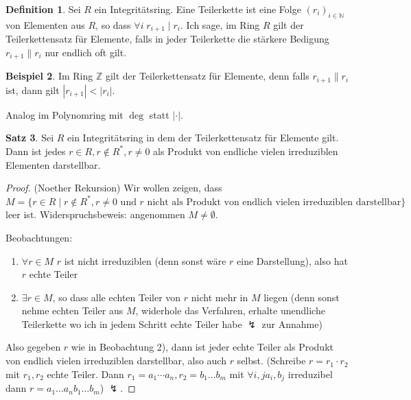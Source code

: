 \documentclass[12pt,parskip=full]{scrartcl}
\newcommand{\setN}{\mathbb{N}}
\newcommand{\setZ}{\mathbb{Z}}
\newcommand{\abs}[1]{{\left| #1 \right|}}
\theoremstyle{definition}
\newtheorem{theorem}{Satz}[section]
\newtheorem{definition}[theorem]{Definition}
\newtheorem{example}[theorem]{Beispiel}
\theoremstyle{remark}
\begin{document}
 	\begin{definition}
 		Sei $R$ ein Integritätsring. Eine Teilerkette ist eine Folge $(r_i)_{i \in \setN}$ von Elementen aus $R$, so dass $\forall i \; r_{i+1} \mid r_i$. Ich sage, im Ring $R$ gilt der Teilerkettensatz für Elemente, falls in jeder Teilerkette die stärkere Bedigung $r_{i+1} \parallel r_i$ nur endlich oft gilt.
 	\end{definition}
 
 	\begin{example}
 		Im Ring $\setZ$ gilt der Teilerkettensatz für Elemente, denn falls $r_{i+1} \parallel r_i$ ist, dann gilt $\abs{r_{i+1}} < \abs{r_i}$.
 		
 		Analog im Polynomring mit $\deg$ statt $\abs{\cdot}$.
 	\end{example}
 
 	\begin{theorem}
 		Sei $R$ ein Integritätsring in dem der Teilerkettensatz für Elemente gilt. Dann ist jedes $r \in R, r \notin R^*, r \neq 0$ als Produkt von endliche vielen irreduziblen Elementen darstellbar.
 	\end{theorem}
 
 	\begin{proof}(Noether Rekursion)
 		Wir wollen zeigen, dass $M = \{ r \in R \mid r \notin R^*, r \neq 0 \text{ und $r$ nicht als Produkt von endlich vielen irreduziblen darstellbar} \}$ leer ist. Widerspruchsbeweis: angenommen $M \neq \emptyset$.
 		
 		Beobachtungen:
 		\begin{enumerate}
 			\item $\forall r \in M$ $r$ ist nicht irreduziblen (denn sonst wäre $r$ eine Darstellung), also hat $r$ echte Teiler
 			\item $\exists r \in M$, so dass alle echten Teiler von $r$ nicht mehr in $M$ liegen (denn sonst nehme echten Teiler aus $M$, widerhole das Verfahren, erhalte unendliche Teilerkette wo ich in jedem Schritt echte Teiler habe $\lightning$ zur Annahme)
 		\end{enumerate}
 	
 		Also gegeben $r$ wie in Beobachtung 2), dann ist jeder echte Teiler als Produkt von endlich vielen irreduziblen darstellbar, also auch $r$ selbst. (Schreibe $r = r_1 \cdot r_2$ mit $r_1, r_2$ echte Teiler. Dann $r_1 = a_1 \cdots a_n, r_2 = b_1 \dots b_m$ mit $\forall i,j a_i, b_j$ irreduzibel dann $r = a_1 \dots a_n b_1 \dots b_m$) $\lightning$.
 	\end{proof}
 
\end{document}

